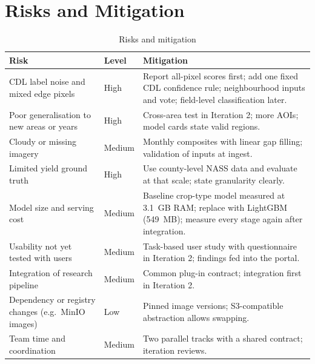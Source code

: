 \section{Risks and Mitigation}
\begin{table}[htbp]
\centering\small
\caption{Risks and mitigation}
\label{tab:risks}
\begin{tabularx}{\textwidth}{L{3.6cm} L{1.4cm} Y}
\toprule
\textbf{Risk} & \textbf{Level} & \textbf{Mitigation}\\
\midrule
CDL label noise and mixed edge pixels & High & Report all-pixel scores first; add one fixed CDL confidence rule; neighbourhood inputs and vote; field-level classification later.\\
Poor generalisation to new areas or years & High & Cross-area test in Iteration 2; more AOIs; model cards state valid regions.\\
Cloudy or missing imagery & Medium & Monthly composites with linear gap filling; validation of inputs at ingest.\\
Limited yield ground truth & High & Use county-level NASS data and evaluate at that scale; state granularity clearly.\\
Model size and serving cost & Medium & Baseline crop-type model measured at 3.1~GB RAM; replace with LightGBM (549~MB); measure every stage again after integration.\\
Usability not yet tested with users & Medium & Task-based user study with questionnaire in Iteration 2; findings fed into the portal.\\
Integration of research pipeline & Medium & Common plug-in contract; integration first in Iteration 2.\\
Dependency or registry changes (e.g.\ MinIO images) & Low & Pinned image versions; S3-compatible abstraction allows swapping.\\
Team time and coordination & Medium & Two parallel tracks with a shared contract; iteration reviews.\\
\bottomrule
\end{tabularx}
\end{table}


